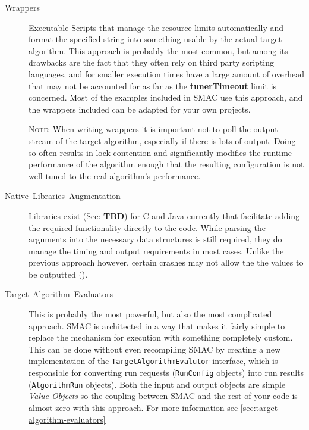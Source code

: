 \documentclass[manual.tex]{subfiles}
\begin{document}
\begin{description}
\item [{Wrappers}] Executable Scripts that manage the resource limits automatically
and format the specified string into something usable by the actual
target algorithm. This approach is probably the most common, but among
its drawbacks are the fact that they often rely on third party scripting languages,
and for smaller execution times have a large amount of overhead that
may not be accounted for as far as the \textbf{tunerTimeout} limit is concerned. Most of the examples included in SMAC use this approach, and the wrappers included can be adapted for your own
projects.

\textsc{Note:} When writing wrappers it is important not to poll the output stream of the target algorithm, especially if there is lots of output. Doing so often results in lock-contention and significantly modifies the runtime performance of the algorithm enough that the resulting configuration is not well tuned to the real algorithm's performance.

\item [{Native~Libraries~Augmentation}] Libraries exist (See: \textbf{TBD}) for C and Java currently that facilitate adding the required functionality directly to the code. While
parsing the arguments into the necessary data structures is still required, they do manage the timing and output requirements in most cases. Unlike the previous approach however, certain crashes may not allow the the values to be outputted ().

\item [{Target~Algorithm~Evaluators}]	This is probably the most powerful, but also the most complicated approach. SMAC is architected in a way that makes it fairly simple to replace the mechanism for execution with something completely custom. This can be done without even recompiling SMAC by creating a new implementation of the \texttt{TargetAlgorithmEvalutor} interface, which is responsible for converting run requests (\texttt{RunConfig} objects) into run results (\texttt{AlgorithmRun} objects). Both the input and output objects are simple \emph{Value Objects} so the coupling between SMAC and the rest of your code is almost zero with this approach.  For more information see \ref{sec:target-algorithm-evaluators}

\end{description}
\end{document}
